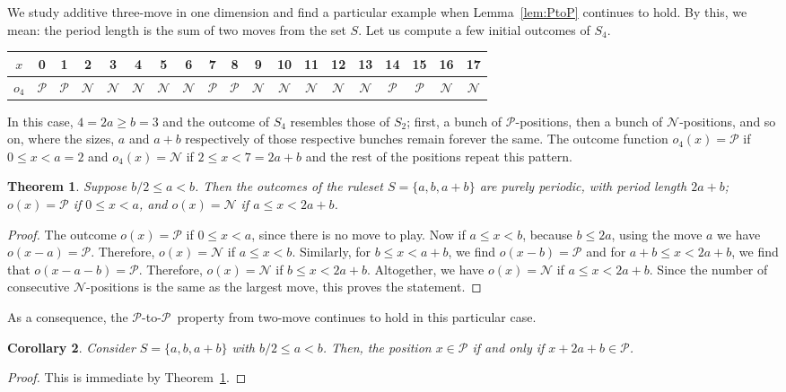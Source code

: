 \documentclass{amsart}
\theoremstyle{plain}
\newtheorem{thm}{Theorem}%
\newtheorem{cor}[thm]{Corollary}
\theoremstyle{definition}
\newcommand{\N}{\ensuremath{\mathcal N}}
\renewcommand{\P}{\ensuremath{\mathcal P}}
\renewcommand{\ge}{\geqslant}
\renewcommand{\le}{\leqslant}
\begin{document}
We study {\sc additive three-move} in one dimension and find a particular example when Lemma~\ref{lem:PtoP} continues to hold. By this, we mean: the period length is the sum of two moves from the set $S$. 
Let us compute a few initial outcomes of $S_4$. 
  \vspace{2 mm}
  
{\small
\begin{center}
\begin{tabular}{|c|c|c|c|c|c|c|c|c|c|c|c|c|c|c|c|c|c|c|}
\hline
$x$ & 0 & 1 & 2 & 3 & 4 & 5 & 6 & 7 & 8 & 9 & 10 & 11 & 12 &13 &14 & 15 & 16 & 17\\ \hline
$o_4$ & \P  & \P & \N & \N & \N & \N & \N & \P & \P & \N & \N  & \N & \N & \N &\P & \P & \N &\N \\ \hline
\end{tabular}
\end{center}}\vspace{2 mm}
 In this case, $4=2a \ge b=3$ and the outcome of $S_4$ resembles those of $S_2$; first, a bunch of \P-positions, then a bunch of \N-positions,  and so on, where the
sizes, $a$ and $a+b$ respectively of those respective bunches remain forever the same. 
 The outcome function  $o_4(x)= \P$ if  $0 \le x  < a=2$ and $o_4(x)= \N$ if  $2 \le x  <7=2a+b$ and the rest of the positions repeat this pattern. 


\begin{thm}%
\label{thm:threemoveonedim}
Suppose $b/2 \le a<b$. Then the outcomes of the ruleset $S=\{a,b, a+b\}$ are purely periodic, with period length $2a+b$; $o(x)=\P$ if $0\le x<a$, and $o(x)=\N$ if $a\le x < 2a+b$. 
\end{thm}
\begin{proof}
The outcome $o(x)=\P$ if $0\le x<a$, since there is no move to play. Now if  $a \le x < b$, because $b\le 2a$,  using the move $a$ we have $o(x-a)=\P$. Therefore, $o(x)= \N$ if $a \le x < b$. Similarly, for $b \le x < a+b$,  we find $o(x-b)= \P$ and for $a+b \le x < 2a+b$,  we find that $o(x-a-b)=\P$. Therefore, $o(x)= \N$ if $b \le x < 2a+b$. Altogether, we have  $o(x)=\N$ if $a\le x < 2a+b$. Since the number of consecutive \N-positions is the same as the largest move, this proves the statement.
\end{proof}
As a consequence, the \P-to-\P\ property from {\sc two-move} continues to hold in this particular case. 
\begin{cor}%
\label{cor:threemove}
    Consider $S=\{a,b,a+b\}$ with  $b/2 \le a < b$. Then,
the position $x \in \P$ if and only if $x+2a+b \in \P$.
\end{cor}
\begin{proof}
  This is immediate by  Theorem~\ref{thm:threemoveonedim}. %
\end{proof}
\end{document}
